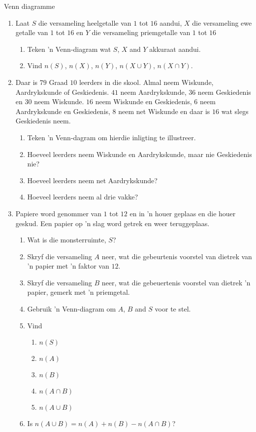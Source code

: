 \begin{exercises}{Venn diagramme}
  \begin{enumerate}[itemsep=5pt, label=\textbf{\arabic*}.]
  \item  Laat $S$ die versameling heelgetalle van $1$ tot $16$ aandui, $X$
    die versameling ewe getalle van $1$ tot $16$ en $Y$ die versameling priemgetalle van $1$ tot $16$
    \begin{enumerate}
    \item Teken 'n Venn-diagram wat $S$, $X$ and $Y$ akkuraat aandui.
    \item Vind $n\left(S\right)$, $n\left(X\right)$, $n\left(Y\right)$,
      $n\left(X\cup Y\right)$, $n\left(X\cap Y\right)$.
    \end{enumerate}
  \item Daar is $79$ Graad $10$ leerders in die skool. Almal neem Wiskunde, Aardrykskunde of Geskiedenis. $41$ neem Aardrykskunde, $36$ neem Geskiedenis en $30$ neem Wiskunde. $16$ neem Wiskunde en Geskiedenis, $6$ neem Aardrykskunde en Geskiedenis, $8$ neem net Wiskunde en daar is $16$ wat slegs Geskiedenis neem.
    \begin{enumerate}
    \item Teken 'n Venn-dagram om hierdie inligting te illustreer.
    \item Hoeveel leerders neem Wiskunde en Aardrykskunde, maar nie Geskiedenis nie?
    \item Hoeveel leerders neem net Aardrykskunde?
    \item Hoeveel leerders neem al drie vakke?
    \end{enumerate}
  \item Papiere word genommer van $1$ tot $12$ en in 'n houer geplaas en die houer geskud. Een papier op 'n slag word getrek en weer teruggeplaas.
    \begin{enumerate}
    \item Wat is die monsterruimte, $S$?
    \item Skryf die versameling $A$ neer, wat die gebeurtenis voorstel van dietrek van 'n papier met 'n faktor van $12$.
    \item Skryf die versameling $B$ neer, wat die gebeuertenis voorstel van dietrek 'n papier, gemerk met 'n priemgetal.
    \item Gebruik 'n Venn-diagram om $A$, $B$ and $S$ voor te stel.
    \item Vind
      \begin{enumerate}
      \item $n\left(S\right)$
      \item $n\left(A\right)$
      \item $n\left(B\right)$
      \item $n\left(A\cap B\right)$
      \item $n\left(A\cup B\right)$
      \end{enumerate}
    \item Is $n\left(A\cup B\right)=n\left(A\right)+n\left(B\right)-n\left(A\cap B\right)$?
    \end{enumerate}
  \end{enumerate}


\end{exercises}
